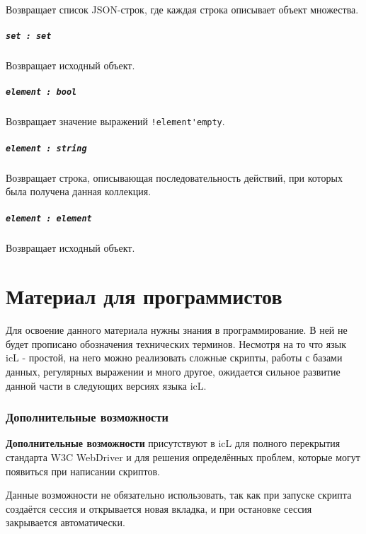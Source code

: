 \documentclass[a4paper, 14pt]{extarticle}
\begin{document}
Возвращает список JSON-строк, где каждая строка описывает объект множества.

\subsubsection{\lstinline|set : set|}

Возвращает исходный объект.

\subsubsection{\lstinline|element : bool|}

Возвращает значение выражений \lstinline|!element'empty|.

\subsubsection{\lstinline|element : string|}

Возвращает строка, описывающая последовательность действий, при которых была получена данная коллекция.

\subsubsection{\lstinline|element : element|}

Возвращает исходный объект.

\newpage
\part{Материал для программистов}

Для освоение данного материала нужны знания в программирование. В ней не будет прописано обозначения технических терминов. Несмотря на то что язык icL - простой, на него можно реализовать сложные скрипты, работы с базами данных, регулярных выражении и много другое, ожидается сильное развитие данной части в следующих версиях языка icL.

\section{Дополнительные возможности}

{\bf Дополнительные возможности} присутствуют в icL для полного перекрытия стандарта W3C WebDriver и для решения определённых проблем, которые могут появиться при написании скриптов.

Данные возможности не обязательно использовать, так как при запуске скрипта создаётся сессия и открывается новая вкладка, и при остановке сессия закрывается автоматически.
\end{document}
